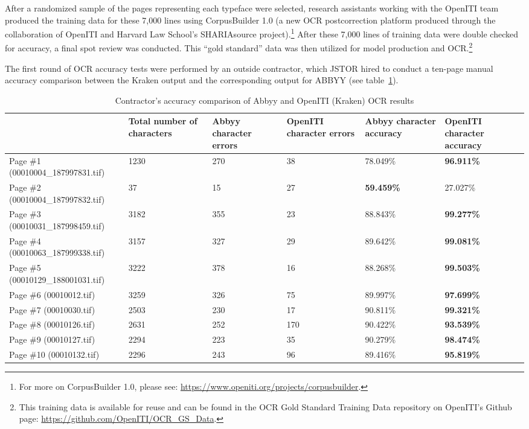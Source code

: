 After a randomized sample of the pages representing each typeface were
selected, research assistants working with the OpenITI team produced the
training data for these 7,000 lines using CorpusBuilder 1.0 (a new OCR
postcorrection platform produced through the collaboration of OpenITI and
Harvard Law School’s SHARIAsource project).\footnote{For more on CorpusBuilder
1.0, please see: \url{https://www.openiti.org/projects/corpusbuilder}.} After
these 7,000 lines of training data were double checked for accuracy, a final
spot review was conducted. This “gold standard” data was then utilized for
model production and OCR.\footnote{This training data is available for reuse
and can be found in the OCR Gold Standard Training Data repository on OpenITI’s
Github page: \url{https://github.com/OpenITI/OCR_GS_Data}.}

The first round of OCR accuracy tests were performed by an outside contractor,
which JSTOR hired to conduct a ten-page manual accuracy comparison between the
Kraken output and the corresponding output for ABBYY (see table~\ref{tab_champs:table_1}).

\begin{table}[h!]
\begin{center}
\caption{Contractor's accuracy comparison of Abbyy and OpenITI (Kraken) OCR results}
\label{tab_champs:table_1}
	\begin{tabularx}{\textwidth}{p{2.7cm}XXXXX} \toprule
& \textbf{Total number of characters} & \textbf{Abbyy character errors} & \textbf{OpenITI character errors} & \textbf{Abbyy character accuracy} & \textbf{OpenITI character accuracy}\\\midrule
Page \#1 \scriptsize{(00010004\_187997831.tif)} & 1230 & 270 & 38 & 78.049\% & \textbf{96.911\%} \\
Page \#2 \scriptsize{(00010004\_187997832.tif)} & 37& 15 & 27 & \textbf{59.459\%} & 27.027\%\\
Page \#3 \scriptsize{(00010031\_187998459.tif)} & 3182 & 355 & 23 & 88.843\% & \textbf{99.277\%}\\
Page \#4 \scriptsize{(00010063\_187999338.tif)} & 3157 & 327 & 29 & 89.642\% & \textbf{99.081\%}\\
Page \#5 \scriptsize{(00010129\_188001031.tif)} & 3222 & 378 & 16 & 88.268\% & \textbf{99.503\%}\\
Page \#6 \scriptsize{(00010012.tif)} & 3259 & 326 & 75 & 89.997\% & \textbf{97.699\%}\\
Page \#7 \scriptsize{(00010030.tif)} & 2503 & 230 & 17 & 90.811\% & \textbf{99.321\%}\\
Page \#8 \scriptsize{(00010126.tif)} & 2631 & 252 & 170 & 90.422\% & \textbf{93.539\%}\\
Page \#9 \scriptsize{(00010127.tif)} & 2294 & 223 & 35 & 90.279\% & \textbf{98.474\%}\\
Page \#10 \scriptsize{(00010132.tif)} & 2296 & 243 & 96 & 89.416\% & \textbf{95.819\%}\\
\bottomrule
\end{tabularx}
\end{center}
\end{table}

